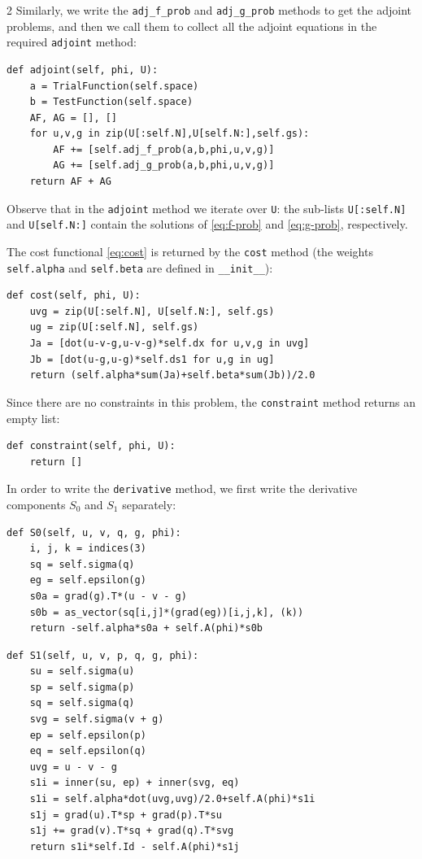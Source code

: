 \documentclass[a4paper, oneside]{article}
\newcommand{\code}[1]{\texttt{#1}}
\begin{document}
\begin{multicols}{2}
Similarly, we write the \code{adj\_f\_prob} and \code{adj\_g\_prob} methods
to get the adjoint problems, and then we call them to collect all the adjoint equations
in the required \code{adjoint} method:  
\begin{lstlisting}
def adjoint(self, phi, U):
	a = TrialFunction(self.space)
	b = TestFunction(self.space)
	AF, AG = [], []
	for u,v,g in zip(U[:self.N],U[self.N:],self.gs):
		AF += [self.adj_f_prob(a,b,phi,u,v,g)]  
		AG += [self.adj_g_prob(a,b,phi,u,v,g)]
	return AF + AG
\end{lstlisting}
Observe that in the \code{adjoint} method we iterate over \code{U}:
the sub-lists \code{U[:self.N]} and \code{U[self.N:]} 
contain the solutions of \eqref{eq:f-prob} and \eqref{eq:g-prob}, respectively.

The cost functional \eqref{eq:cost} is returned by the \code{cost} method
(the weights \code{self.alpha} and \code{self.beta} are defined in \code{\_\_init\_\_}):
\begin{lstlisting}
def cost(self, phi, U):
	uvg = zip(U[:self.N], U[self.N:], self.gs)
	ug = zip(U[:self.N], self.gs)
	Ja = [dot(u-v-g,u-v-g)*self.dx for u,v,g in uvg]
	Jb = [dot(u-g,u-g)*self.ds1 for u,g in ug]
	return (self.alpha*sum(Ja)+self.beta*sum(Jb))/2.0
\end{lstlisting}

Since there are no constraints in this problem,
the \code{constraint} method returns an empty list:
\begin{lstlisting}
def constraint(self, phi, U):
	return []
\end{lstlisting}

In order to write the \code{derivative} method,
we first write the derivative components $S_0$ and $S_1$ separately:
\begin{lstlisting}
def S0(self, u, v, q, g, phi):
	i, j, k = indices(3)
	sq = self.sigma(q)
	eg = self.epsilon(g)
	s0a = grad(g).T*(u - v - g)
	s0b = as_vector(sq[i,j]*(grad(eg))[i,j,k], (k))
	return -self.alpha*s0a + self.A(phi)*s0b	
\end{lstlisting}
\begin{lstlisting}
def S1(self, u, v, p, q, g, phi):
	su = self.sigma(u)
	sp = self.sigma(p)
	sq = self.sigma(q)
	svg = self.sigma(v + g)
	ep = self.epsilon(p)
	eq = self.epsilon(q)
	uvg = u - v - g
	s1i = inner(su, ep) + inner(svg, eq)
	s1i = self.alpha*dot(uvg,uvg)/2.0+self.A(phi)*s1i
	s1j = grad(u).T*sp + grad(p).T*su 
	s1j += grad(v).T*sq + grad(q).T*svg
	return s1i*self.Id - self.A(phi)*s1j
\end{lstlisting}


\end{multicols}
\end{document}
